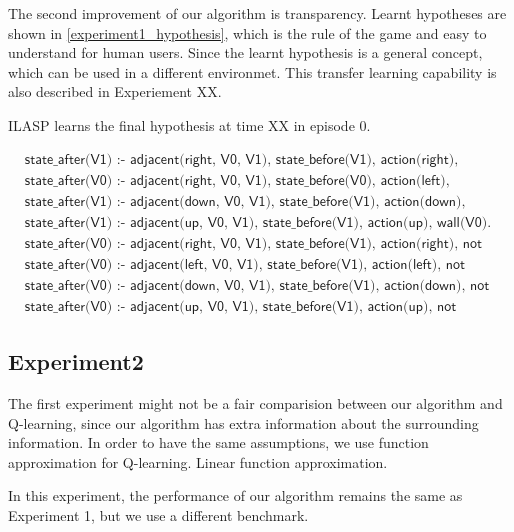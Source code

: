 The second improvement of our algorithm is transparency. 
Learnt hypotheses are shown in \ref{experiment1_hypothesis}, 
which is the rule of the game and easy to understand for human users. Since the learnt hypothesis is a general concept, which can be used in a different environmet. 
This transfer learning capability is also described in Experiement XX. 

ILASP learns the final hypothesis at time XX in episode 0.

\begin{equation}
\begin{split}
&\textsf{state\_after(V1) :- adjacent(right, V0, V1), state\_before(V1), action(right), wall(V0).}\\
&\textsf{state\_after(V0) :- adjacent(right, V0, V1), state\_before(V0), action(left), wall(V1).}\\
&\textsf{state\_after(V1) :- adjacent(down, V0, V1), state\_before(V1), action(down), wall(V0).}\\
&\textsf{state\_after(V1) :- adjacent(up, V0, V1), state\_before(V1), action(up), wall(V0).}\\
&\textsf{state\_after(V0) :- adjacent(right, V0, V1), state\_before(V1), action(right), not wall(V0).}\\
&\textsf{state\_after(V0) :- adjacent(left, V0, V1), state\_before(V1), action(left), not wall(V0).}\\
&\textsf{state\_after(V0) :- adjacent(down, V0, V1), state\_before(V1), action(down), not wall(V0).}\\
&\textsf{state\_after(V0) :- adjacent(up, V0, V1), state\_before(V1), action(up), not wall(V0).}
\end{split}
\end{equation}
\label{experiment1_hypothesis}

\subsection{Experiment2}

The first experiment might not be a fair comparision between our algorithm and Q-learning, since our algorithm has extra information about the surrounding information.
In order to have the same assumptions, we use function approximation for Q-learning.
Linear function approximation.

In this experiment, the performance of our algorithm remains the same as Experiment 1, but we use a different benchmark. 
\newpage
